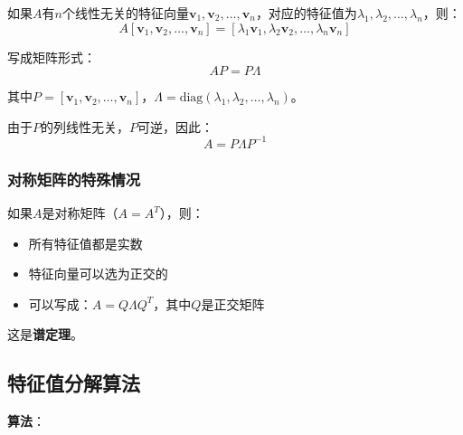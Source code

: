 \documentclass[12pt,a4paper]{article}
\begin{document}
如果$A$有$n$个线性无关的特征向量$\bm{v}_1, \bm{v}_2, \ldots, \bm{v}_n$，对应的特征值为$\lambda_1, \lambda_2, \ldots, \lambda_n$，则：
\begin{equation}
A[\bm{v}_1, \bm{v}_2, \ldots, \bm{v}_n] = [\lambda_1\bm{v}_1, \lambda_2\bm{v}_2, \ldots, \lambda_n\bm{v}_n]
\end{equation}

写成矩阵形式：
\begin{equation}
AP = P\Lambda
\end{equation}

其中$P = [\bm{v}_1, \bm{v}_2, \ldots, \bm{v}_n]$，$\Lambda = \text{diag}(\lambda_1, \lambda_2, \ldots, \lambda_n)$。

由于$P$的列线性无关，$P$可逆，因此：
\begin{equation}
A = P\Lambda P^{-1}
\end{equation}

\subsubsection{对称矩阵的特殊情况}

如果$A$是对称矩阵（$A = A^T$），则：
\begin{itemize}
\item 所有特征值都是实数
\item 特征向量可以选为正交的
\item 可以写成：$A = Q\Lambda Q^T$，其中$Q$是正交矩阵
\end{itemize}

这是\textbf{谱定理}。

\subsection{特征值分解算法}

\textbf{算法}：
\end{document}
